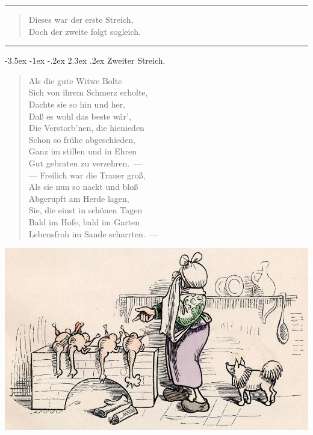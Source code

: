 \documentclass[a4paper,12pt]{article}
\makeatletter
\renewcommand\section{\@startsection {section}{1}{\z@}%
                                   {-3.5ex \@plus -1ex \@minus -.2ex}%
                                   {2.3ex \@plus.2ex}%
                                   {\centering\normalfont\LARGE\bfseries}}
\makeatother
\begin{document}
\hrule


\begin{verse}
Dieses war der erste Streich,\\{}
Doch der zweite folgt sogleich.
\end{verse}


\hrule


\clearpage
\section{Zweiter Streich.\label{Zweiter_Streich}}


\begin{verse}
Als die gute Witwe Bolte\\{}
Sich von ihrem Schmerz erholte,\\{}
Dachte sie so hin und her,\\{}
Daß es wohl das beste wär',\\{}
Die Verstorb'nen, die hienieden\\{}
Schon so frühe abgeschieden,\\{}
Ganz im stillen und in Ehren\\{}
Gut gebraten zu verzehren.~—\\{}
— Freilich war die Trauer groß,\\{}
Als sie nun so nackt und bloß\\{}
Abgerupft am Herde lagen,\\{}
Sie, die einst in schönen Tagen\\{}
Bald im Hofe, bald im Garten\\{}
Lebensfroh im Sande scharrten.~—
\end{verse}



\begin{center}\includegraphics[scale=.7, alt={sie weint aufs neu}]{images/2-01.jpg}\end{center}
\end{document}
